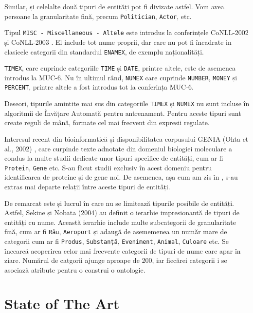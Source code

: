Similar, și celelalte două tipuri de entități pot fi divizate astfel. Vom avea persoane la granularitate fină, precum \texttt{Politician}, \texttt{Actor}, etc.

Tipul \texttt{MISC - Miscellaneous - Altele} este introdus la conferințele CoNLL-2002 și CoNLL-2003 \cite{conll2003}. El include tot nume proprii, dar care nu pot fi încadrate in clasicele categorii din standardul \texttt{ENAMEX}, de exemplu naționalități.

\texttt{TIMEX}, care cuprinde categoriile \texttt{TIME} și \texttt{DATE}, printre altele, este de asemenea introdus la MUC-6. Nu în ultimul rând, \texttt{NUMEX} care cuprinde \texttt{NUMBER}, \texttt{MONEY} și \texttt{PERCENT}, printre altele a fost introdus tot la conferința MUC-6.

Deseori, tipurile amintite mai sus din categoriile \texttt{TIMEX} și \texttt{NUMEX} nu sunt incluse în algoritmii de Învățare Automată pentru antrenament. Pentru aceste tipuri sunt create reguli de mână, formate cel mai frecvent din expresii regulate.


Interesul recent din bioinformatică și disponibilitatea corpusului GENIA (Ohta et al., 2002) \cite{Ohta02thegenia}, care curpinde texte adnotate din domeniul biologiei moleculare a condus la multe studii dedicate unor tipuri specifice de entități, cum ar fi \texttt{Protein}, \texttt{Gene} etc. S-au făcut studii exclusiv în acest domeniu pentru identificarea de proteine și de gene noi. De asemenea, așa cum am zis în , s-au extras mai departe relații între aceste tipuri de entități.


De remarcat este și lucrul în care nu se limitează tipurile posibile de entități. Astfel, Sekine și Nobata (2004) au definit o ierarhie impresionantă de tipuri de entități cu nume. Această ierarhie include multe subcategorii de granularitate fină, cum ar fi \texttt{Râu}, \texttt{Aeroport} și adaugă de asememenea un număr mare de categorii cum ar fi \texttt{Produs}, \texttt{Substanță}, \texttt{Eveniment}, \texttt{Animal}, \texttt{Culoare} etc. Se încearcă acoperirea celor mai frecvente categorii de tipuri de nume care apar în ziare. Numărul de catgorii ajunge aproape de 200, iar fiecărei categorii i se asociază atribute pentru o construi o ontologie. \cite{sekine2004}

\section{State of The Art}

